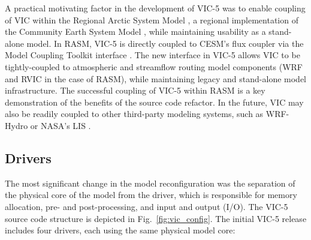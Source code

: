 \documentclass[gmd, manuscript]{copernicus}
\begin{document}
    A practical motivating factor in the development of VIC-5 was to enable coupling of VIC within the Regional Arctic System Model \citep[RASM;][]{Hamman_2016a}, a regional implementation of the Community Earth System Model \citep[CESM;][]{Hurrell_2013}, while maintaining usability as a stand-alone model. In RASM, VIC-5 is directly coupled to CESM's flux coupler \citep[CPL7;][]{Craig_2012} via the Model Coupling Toolkit interface \citep[MCT;][]{Larson_2005}. The new interface in VIC-5 allows VIC to be tightly-coupled to atmospheric and streamflow routing model components (WRF and RVIC in the case of RASM), while maintaining legacy and stand-alone model infrastructure. The successful coupling of VIC-5 within RASM is a key demonstration of the benefits of the source code refactor. In the future, VIC may also be readily coupled to other third-party modeling systems, such as WRF-Hydro \citep{Gochis_2013} or NASA's LIS \citep{Kumar_2006}.

  \subsection{Drivers}
    \label{sec:drivers}
    The most significant change in the model reconfiguration was the separation of the physical core of the model from the driver, which is responsible for memory allocation, pre- and post-processing, and input and output (I/O). The VIC-5 source code structure is depicted in Fig.~\ref{fig:vic_config}. The initial VIC-5 release includes four drivers, each using the same physical model core:
\end{document}
